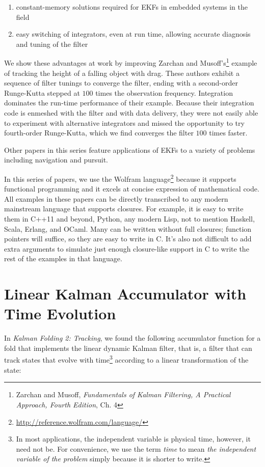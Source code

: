 \documentclass[10pt,oneside,x11names]{article}
\begin{document}
\begin{enumerate}
\item constant-memory solutions
required for EKFs in embedded systems in the field

\item easy switching of integrators, even at run time, allowing accurate diagnosis and
tuning of the filter
\end{enumerate}

We show these advantages at work by improving Zarchan and Musoff's\footnote{Zarchan and Musoff, \emph{Fundamentals of Kalman Filtering, A Practical
Approach, Fourth Edition}, Ch. 4}
example of tracking the height of a falling object with drag. These authors
exhibit a sequence of filter tunings to converge the filter, ending with a
second-order Runge-Kutta stepped at \(100\) times the observation frequency.
Integration dominates the run-time performance of their example. Because their
integration code is enmeshed with the filter and with data delivery, they were
not easily able to experiment with alternative integrators and missed the
opportunity to try fourth-order Runge-Kutta, which we find converges the filter
\(100\) times faster. 

Other papers in this series feature applications of EKFs to a variety of
problems including navigation and pursuit.

In this series of papers, we use the Wolfram language\footnote{\url{http://reference.wolfram.com/language/}} because it
supports functional programming and it excels
at concise expression of mathematical code. All examples in these papers can be
directly transcribed to any modern mainstream language that supports closures.
For example, it is easy to write them in C++11 and beyond, Python, any modern
Lisp, not to mention Haskell, Scala, Erlang, and OCaml. Many can be written
without full closures; function pointers will suffice, so they are easy to write
in C. It's also not difficult to add extra arguments to simulate just enough
closure-like support in C to write the rest of the examples in that language.

\section{Linear Kalman Accumulator with Time Evolution}
\label{sec:orgheadline4}

In \emph{Kalman Folding 2: Tracking},\footnotemark[2]{} we found the following
accumulator function for a fold that implements the linear
dynamic Kalman filter, that is, a filter that can track states that evolve with
time\footnote{In most applications, the independent variable is physical time,
however, it need not be. For convenience, we use the term \emph{time} to mean \emph{the independent variable of the problem} simply because it is shorter to write.} according to a linear transformation of the state:
\end{document}
